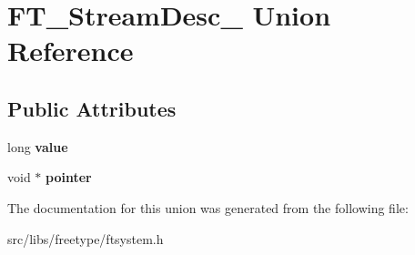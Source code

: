 \hypertarget{union_f_t___stream_desc__}{
\section{FT\_\-StreamDesc\_\- Union Reference}
\label{union_f_t___stream_desc__}
}
\subsection*{Public Attributes}
\begin{DoxyCompactItemize}
\item 
\hypertarget{union_f_t___stream_desc___a1a94493032faef1c3ed7bc33816ce90c}{
long {\bfseries value}}
\label{union_f_t___stream_desc___a1a94493032faef1c3ed7bc33816ce90c}

\item 
\hypertarget{union_f_t___stream_desc___a410ed102dc377fb9a5b9c950c3f863dc}{
void $\ast$ {\bfseries pointer}}
\label{union_f_t___stream_desc___a410ed102dc377fb9a5b9c950c3f863dc}

\end{DoxyCompactItemize}


The documentation for this union was generated from the following file:\begin{DoxyCompactItemize}
\item 
src/libs/freetype/ftsystem.h\end{DoxyCompactItemize}
